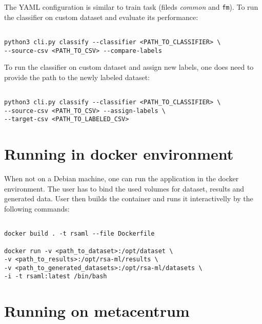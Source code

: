 \noindent
The YAML configuration is similar to train task (fileds \textit{common} and \texttt{fm}). To run the classifier on custom dataset and evaluate its performance:

\begin{verbatim}

python3 cli.py classify --classifier <PATH_TO_CLASSIFIER> \
--source-csv <PATH_TO_CSV> --compare-labels

\end{verbatim}

\noindent
To run the classifier on custom dataset and assign new labels, one does need to provide the path to the newly labeled dataset:

\begin{verbatim}

python3 cli.py classify --classifier <PATH_TO_CLASSIFIER> \
--source-csv <PATH_TO_CSV> --assign-labels \
--target-csv <PATH_TO_LABELED_CSV>

\end{verbatim}

\section{Running in docker environment}
\label{appendix-docker}

When not on a Debian machine, one can run the application in the docker environment. The user has to bind the used volumes for dataset, results and generated data. User then builds the container and runs it interactivelly by the following commands:

\begin{verbatim}

docker build . -t rsaml --file Dockerfile

docker run -v <path_to_dataset>:/opt/dataset \
-v <path_to_results>:/opt/rsa-ml/results \
-v <path_to_generated_datasets>:/opt/rsa-ml/datasets \
-i -t rsaml:latest /bin/bash

\end{verbatim}

\section{Running on metacentrum}
\label{appendix-metacentrum}

